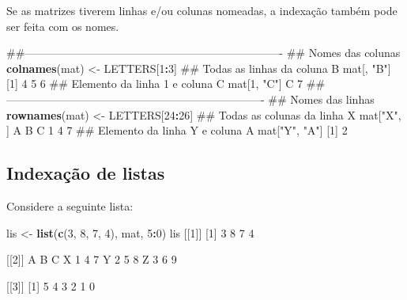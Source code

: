 \documentclass[10pt,a4paper]{book}
\newenvironment{Shaded}{\begin{snugshade}}{\end{snugshade}}
\newcommand{\KeywordTok}[1]{\textcolor[rgb]{0.13,0.29,0.53}{\textbf{#1}}}
\newcommand{\DecValTok}[1]{\textcolor[rgb]{0.00,0.00,0.81}{#1}}
\newcommand{\StringTok}[1]{\textcolor[rgb]{0.31,0.60,0.02}{#1}}
\newcommand{\OperatorTok}[1]{\textcolor[rgb]{0.81,0.36,0.00}{\textbf{#1}}}
\newcommand{\NormalTok}[1]{#1}
\begin{document}
Se as matrizes tiverem linhas e/ou colunas nomeadas, a indexação também
pode ser feita com os nomes.

\begin{Shaded}
\begin{Highlighting}[]
\NormalTok{##----------------------------------------------------------------------}
\NormalTok{## Nomes das colunas}
\KeywordTok{colnames}\NormalTok{(mat) <-}\StringTok{ }\NormalTok{LETTERS[}\DecValTok{1}\OperatorTok{:}\DecValTok{3}\NormalTok{]}
\NormalTok{## Todas as linhas da coluna B}
\NormalTok{mat[, }\StringTok{"B"}\NormalTok{]}
\NormalTok{[}\DecValTok{1}\NormalTok{] }\DecValTok{4} \DecValTok{5} \DecValTok{6}
\NormalTok{## Elemento da linha 1 e coluna C}
\NormalTok{mat[}\DecValTok{1}\NormalTok{, }\StringTok{"C"}\NormalTok{]}
\NormalTok{C }
\DecValTok{7} 
\NormalTok{##----------------------------------------------------------------------}
\NormalTok{## Nomes das linhas}
\KeywordTok{rownames}\NormalTok{(mat) <-}\StringTok{ }\NormalTok{LETTERS[}\DecValTok{24}\OperatorTok{:}\DecValTok{26}\NormalTok{]}
\NormalTok{## Todas as colunas da linha X}
\NormalTok{mat[}\StringTok{"X"}\NormalTok{, ]}
\NormalTok{A B C }
\DecValTok{1} \DecValTok{4} \DecValTok{7} 
\NormalTok{## Elemento da linha Y e coluna A}
\NormalTok{mat[}\StringTok{"Y"}\NormalTok{, }\StringTok{"A"}\NormalTok{]}
\NormalTok{[}\DecValTok{1}\NormalTok{] }\DecValTok{2}
\end{Highlighting}
\end{Shaded}

\subsection{Indexação de listas}\label{indexauxe7uxe3o-de-listas}

Considere a seguinte lista:

\begin{Shaded}
\begin{Highlighting}[]
\NormalTok{lis <-}\StringTok{ }\KeywordTok{list}\NormalTok{(}\KeywordTok{c}\NormalTok{(}\DecValTok{3}\NormalTok{, }\DecValTok{8}\NormalTok{, }\DecValTok{7}\NormalTok{, }\DecValTok{4}\NormalTok{), mat, }\DecValTok{5}\OperatorTok{:}\DecValTok{0}\NormalTok{)}
\NormalTok{lis}
\NormalTok{[[}\DecValTok{1}\NormalTok{]]}
\NormalTok{[}\DecValTok{1}\NormalTok{] }\DecValTok{3} \DecValTok{8} \DecValTok{7} \DecValTok{4}

\NormalTok{[[}\DecValTok{2}\NormalTok{]]}
\NormalTok{  A B C}
\NormalTok{X }\DecValTok{1} \DecValTok{4} \DecValTok{7}
\NormalTok{Y }\DecValTok{2} \DecValTok{5} \DecValTok{8}
\NormalTok{Z }\DecValTok{3} \DecValTok{6} \DecValTok{9}

\NormalTok{[[}\DecValTok{3}\NormalTok{]]}
\NormalTok{[}\DecValTok{1}\NormalTok{] }\DecValTok{5} \DecValTok{4} \DecValTok{3} \DecValTok{2} \DecValTok{1} \DecValTok{0}
\end{Highlighting}
\end{Shaded}
\end{document}
